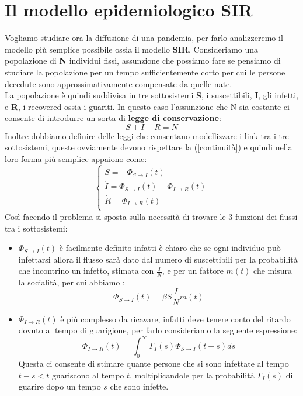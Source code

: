 \section{Il modello epidemiologico SIR}

Vogliamo studiare ora la diffusione di una pandemia, per farlo analizzeremo il modello più semplice possibile ossia il modello \textbf{SIR}. Consideriamo una popolazione di \textbf{N} individui fissi, assunzione che possiamo fare se pensiamo di studiare la popolazione per un tempo sufficientemente corto per cui le persone decedute sono approssimativamente compensate da quelle nate. \\
La popolazione è quindi suddivisa in tre sottosistemi \textbf{S}, i suscettibili, \textbf{I}, gli infetti, e \textbf{R}, i recovered ossia i guariti. In questo caso l'assunzione che N sia costante ci consente di introdurre un sorta di \textbf{legge di conservazione}:
\begin{equation}
	S+I+R=N
	\label{continuità}
\end{equation} 
Inoltre dobbiamo definire delle leggi che consentano modellizzare i link tra i tre sottosistemi, queste ovviamente devono rispettare la (\ref{continuità}) e quindi nella loro forma più semplice appaiono come:
\begin{equation}
	\begin{cases}
		\dot{S}=-\Phi_{S\rightarrow I}(t)\\
		\dot{I}=\Phi_{S\rightarrow I}(t)-\Phi_{I\rightarrow R}(t)\\
		\dot{R}=\Phi_{I\rightarrow R}(t)\\
	\end{cases}
\label{flussi}
\end{equation}
Così facendo il problema si sposta sulla necessità di trovare le 3 funzioni dei flussi tra i sottosistemi:
\begin{itemize}
	\item $\Phi_{S\rightarrow I}(t)$ è facilmente definito infatti è chiaro che se ogni individuo può infettarsi allora il flusso sarà dato dal numero di suscettibili per la probabilità che incontrino un infetto, stimata con $\frac{I}{N}$, e per un fattore $m(t)$ che misura la socialità, per cui abbiamo :
	\begin{equation}
		\Phi_{S\rightarrow I}(t)=\beta S\frac{I}{N}m(t)
	\end{equation}
    \item $\Phi_{I\rightarrow R}(t)$ è più complesso da ricavare, infatti deve tenere conto del ritardo dovuto al tempo di guarigione, per farlo consideriamo la seguente espressione:
    \begin{equation}
    	\Phi_{I\rightarrow R}(t)=\int_{0}^{\infty}\Gamma_I(s) \Phi_{S\rightarrow I}(t-s)ds
    \end{equation}
     Questa ci consente di stimare quante persone che si sono infettate al tempo $t-s< t$ guariscono al tempo $t$, moltiplicandole per la probabilità $\Gamma_I(s)$ di guarire dopo un tempo $s$ che sono infette. 
\end{itemize}
\vspace{5pt}

